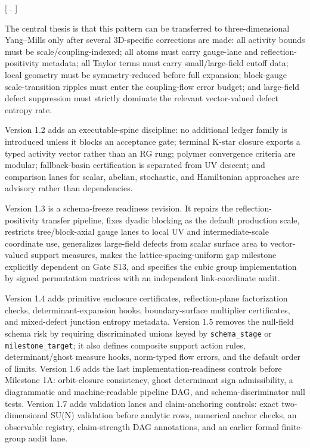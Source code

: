 \documentclass[
]{article}
\begin{document}
{[}  \to {} \to
{} \to {} \to
{} \to {} \to
{}. {]}

The central thesis is that this pattern can be transferred to
three-dimensional Yang--Mills only after several 3D-specific corrections
are made: all activity bounds must be scale/coupling-indexed; all atoms
must carry gauge-lane and reflection-positivity metadata; all Taylor
terms must carry small/large-field cutoff data; local geometry must be
symmetry-reduced before full expansion; block-gauge scale-transition
ripples must enter the coupling-flow error budget; and large-field
defect suppression must strictly dominate the relevant vector-valued
defect entropy rate.

Version 1.2 adds an executable-spine discipline: no additional ledger
family is introduced unless it blocks an acceptance gate; terminal
K-star closure exports a typed activity vector rather than an RG rung;
polymer convergence criteria are modular; fallback-basin certification
is separated from UV descent; and comparison lanes for scalar, abelian,
stochastic, and Hamiltonian approaches are advisory rather than
dependencies.

Version 1.3 is a schema-freeze readiness revision. It repairs the
reflection-positivity transfer pipeline, fixes dyadic blocking as the
default production scale, restricts tree/block-axial gauge lanes to
local UV and intermediate-scale coordinate use, generalizes large-field
defects from scalar surface area to vector-valued support measures,
makes the lattice-spacing-uniform gap milestone explicitly dependent on
Gate S13, and specifies the cubic group implementation by signed
permutation matrices with an independent link-coordinate audit.

Version 1.4 adds primitive enclosure certificates, reflection-plane
factorization checks, determinant-expansion hooks, boundary-surface
multiplier certificates, and mixed-defect junction entropy metadata.
Version 1.5 removes the null-field schema risk by requiring
discriminated unions keyed by \texttt{schema\_stage} or
\texttt{milestone\_target}; it also defines composite support action
rules, determinant/ghost measure hooks, norm-typed flow errors, and the
default order of limits. Version 1.6 adds the last
implementation-readiness controls before Milestone 1A: orbit-closure
consistency, ghost determinant sign admissibility, a diagrammatic and
machine-readable pipeline DAG, and schema-discriminator null tests.
Version 1.7 adds validation lanes and claim-anchoring controls: exact
two-dimensional SU(N) validation before analytic rows, numerical anchor
checks, an observable registry, claim-strength DAG annotations, and an
earlier formal finite-group audit lane.
\end{document}
